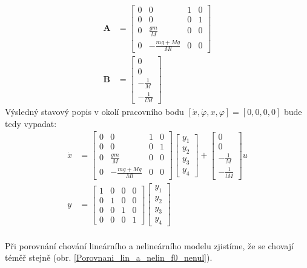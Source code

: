 \documentclass[a4paper, 12pt]{article}
\begin{document}
			\begin{align*}
				\mathbf{A} &= \left[\begin{matrix}
					0 & 0 & 1 & 0\\
					0 & 0 & 0 & 1\\
					0 & \frac{gm}{M} & 0 & 0\\
					0 & -\frac{mg+Mg}{Ml} & 0 & 0
				\end{matrix}\right]\\
				\mathbf{B} &= \left[\begin{matrix}
					0\\
					0\\
					-\frac{1}{M}\\
					-\frac{1}{lM}
				\end{matrix}\right]
			\end{align*}
			Výsledný stavový popis v okolí pracovního bodu $\left[\dot{x}, \dot{\varphi}, x, \varphi\right]=\left[0, 0, 0, 0\right]$ bude tedy vypadat:
			\begin{align*}
				\dot{x}&=\left[\begin{matrix}
					0 & 0 & 1 & 0\\
					0 & 0 & 0 & 1\\
					0 & \frac{gm}{M} & 0 & 0\\
					0 & -\frac{mg+Mg}{Ml} & 0 & 0
				\end{matrix}\right]
				\left[\begin{matrix}
					y_1\\
					y_2\\
					y_3\\
					y_4
				\end{matrix}\right]
				+
				\left[\begin{matrix}
					0\\
					0\\
					-\frac{1}{M}\\
					-\frac{1}{lM}
				\end{matrix}\right]u\\
				y&=\left[\begin{matrix}
					1 & 0 & 0 & 0\\
					0 & 1 & 0 & 0\\
					0 & 0 & 1 & 0\\
					0 & 0 & 0 & 1
				\end{matrix}\right]
				\left[\begin{matrix}
					y_1\\
					y_2\\
					y_3\\
					y_4
				\end{matrix}\right]
			\end{align*}
			\\Při porovnání chování lineárního a nelineárního modelu zjistíme, že se chovají téměř stejně (obr. \ref{Porovnani_lin_a_nelin_f0_nenul}).
\end{document}
